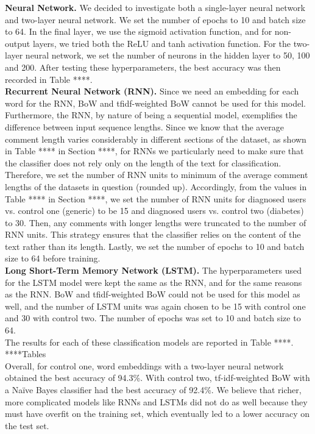 \documentclass[11pt,a4paper]{article}
\begin{document}
\indent \textbf{Neural Network.} We decided to investigate both a single-layer neural network and two-layer neural network. We set the number of epochs to 10 and batch size to 64. In the final layer, we use the sigmoid activation function, and for non-output layers, we tried both the ReLU and tanh activation function. For the two-layer neural network, we set the number of neurons in the hidden layer to 50, 100 and 200. After testing these hyperparameters, the best accuracy was then recorded in Table ****. \\
\indent \textbf{Recurrent Neural Network (RNN).} Since we need an embedding for each word for the RNN, BoW and tfidf-weighted BoW cannot be used for this model. Furthermore, the RNN, by nature of being a sequential model, exemplifies the difference between input sequence lengths. Since we know that the average comment length varies considerably in different sections of the dataset, as shown in Table **** in Section ****, for RNNs we particularly need to make sure that the classifier does not rely only on the length of the text for classification. Therefore, we set the number of RNN units to minimum of the average comment lengths of the datasets in question (rounded up). Accordingly, from the values in Table **** in Section ****, we set the number of RNN units for diagnosed users vs. control one (generic) to be 15 and diagnosed users vs. control two (diabetes) to 30. Then, any comments with longer lengths were truncated to the number of RNN units. This strategy ensures that the classifier relies on the content of the text rather than its length. Lastly, we set the number of epochs to 10 and batch size to 64 before training. \\
\indent \textbf{Long Short-Term Memory Network (LSTM).} The hyperparameters used for the LSTM model were kept the same as the RNN, and for the same reasons as the RNN. BoW and tfidf-weighted BoW could not be used for this model as well, and the number of LSTM units was again chosen to be 15 with control one and 30 with control two. The number of epochs was set to 10 and batch size to 64. \\
\indent The results for each of these classification models are reported in Table ****. \\
****Tables \\
\indent Overall, for control one, word embeddings with a two-layer neural network obtained the best accuracy of 94.3\%. With control two, tf-idf-weighted BoW with a Naïve Bayes classifier had the best accuracy of 92.4\%. We believe that richer, more complicated models like RNNs and LSTMs did not do as well because they must have overfit on the training set, which eventually led to a lower accuracy on the test set. \\
\end{document}
